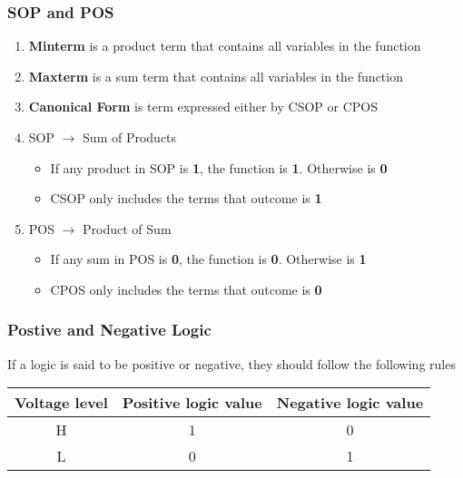 \subsubsection{SOP and POS}
\begin{enumerate}
    \item \textbf{Minterm} is a product term that contains all variables in the function
    \item \textbf{Maxterm} is a sum term that contains all variables in the function
    \item \textbf{Canonical Form} is term expressed either by CSOP or CPOS
    \item SOP $\rightarrow$ Sum of Products
    \begin{itemize}
        \item If any product in SOP is \textbf{1}, the function is \textbf{1}. Otherwise is \textbf{0}
        \item CSOP only includes the terms that outcome is \textbf{1}
    \end{itemize}
    \item POS $\rightarrow$ Product of Sum
        \begin{itemize}
            \item If any sum in POS is \textbf{0}, the function is \textbf{0}. Otherwise is \textbf{1}
            \item CPOS only includes the terms that outcome is \textbf{0}
        \end{itemize}
\end{enumerate}

\subsubsection{Postive and Negative Logic}
If a logic is said to be positive or negative, they should follow the following rules
\begin{table}[h]
    \centering
    \begin{tabular}{|c|c|c|}
        \hline
        Voltage level & Positive logic value& Negative logic value \\
        \hline
        H & 1 & 0\\
        \hline
        L & 0 & 1\\
        \hline
    \end{tabular}
\end{table}


